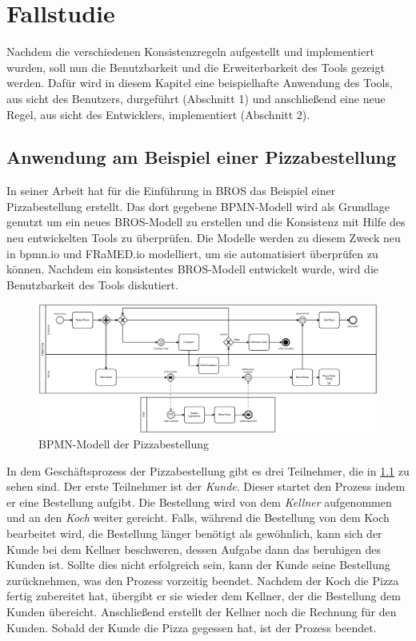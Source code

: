 \chapter{Fallstudie}
\label{chap:evaluation}

Nachdem die verschiedenen Konsistenzregeln aufgestellt und implementiert wurden, soll nun die Benutzbarkeit und die Erweiterbarkeit des Tools gezeigt werden.
Dafür wird in diesem Kapitel eine beispielhafte Anwendung des Tools, aus sicht des Benutzers, durgeführt (Abschnitt 1) und anschließend eine neue Regel, aus sicht des Entwicklers, implementiert (Abschnitt 2).

\section{Anwendung am Beispiel einer Pizzabestellung}

In seiner Arbeit hat \cite{Schoen} für die Einführung in BROS das Beispiel einer Pizzabestellung erstellt.
Das dort gegebene BPMN-Modell wird als Grundlage genutzt um ein neues BROS-Modell zu erstellen und die Konsistenz mit Hilfe des neu entwickelten Tools zu überprüfen.
Die Modelle werden zu diesem Zweck neu in bpmn.io und FRaMED.io modelliert, um sie automatisiert überprüfen zu können.
Nachdem ein konsistentes BROS-Modell entwickelt wurde, wird die Benutzbarkeit des Tools diskutiert.

\begin{figure}
    \centering
    \includegraphics[width=\textwidth,keepaspectratio]{../images/example/bpmn.pdf}%
    \caption{BPMN-Modell der Pizzabestellung}%
    \label{fig:pizzaBpmn}
\end{figure}

In dem Geschäftsprozess der Pizzabestellung gibt es drei Teilnehmer, die in \cref{fig:pizzaBpmn} zu sehen sind.
Der erste Teilnehmer ist der \emph{Kunde}.
Dieser startet den Prozess indem er eine Bestellung aufgibt.
Die Bestellung wird von dem \emph{Kellner} aufgenommen und an den \emph{Koch} weiter gereicht.
Falls, während die Bestellung von dem Koch bearbeitet wird, die Bestellung länger benötigt als gewöhnlich, kann sich der Kunde bei dem Kellner beschweren, dessen Aufgabe dann das beruhigen des Kunden ist.
Sollte dies nicht erfolgreich sein, kann der Kunde seine Bestellung zurücknehmen, was den Prozess vorzeitig beendet.
Nachdem der Koch die Pizza fertig zubereitet hat, übergibt er sie wieder dem Kellner, der die Bestellung dem Kunden übereicht.
Anschließend erstellt der Kellner noch die Rechnung für den Kunden.
Sobald der Kunde die Pizza gegessen hat, ist der Prozess beendet.

